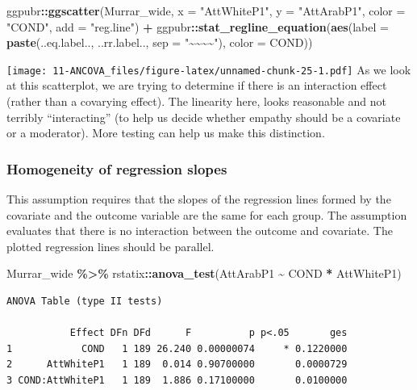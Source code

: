 \documentclass[
  11pt,
]{book}
\newenvironment{Shaded}{\begin{snugshade}}{\end{snugshade}}
\newcommand{\AttributeTok}[1]{\textcolor[rgb]{0.27,0.27,0.27}{#1}}
\newcommand{\FunctionTok}[1]{\textcolor[rgb]{0.27,0.27,0.27}{\textbf{#1}}}
\newcommand{\NormalTok}[1]{#1}
\newcommand{\SpecialCharTok}[1]{\textcolor[rgb]{0.43,0.43,0.43}{\textbf{#1}}}
\newcommand{\StringTok}[1]{\textcolor[rgb]{0.5,0.5,0.5}{#1}}
\begin{document}
\begin{Shaded}
\begin{Highlighting}[]
\NormalTok{ggpubr}\SpecialCharTok{::}\FunctionTok{ggscatter}\NormalTok{(Murrar\_wide, }\AttributeTok{x =} \StringTok{"AttWhiteP1"}\NormalTok{, }\AttributeTok{y =} \StringTok{"AttArabP1"}\NormalTok{, }\AttributeTok{color =} \StringTok{"COND"}\NormalTok{,}
    \AttributeTok{add =} \StringTok{"reg.line"}\NormalTok{) }\SpecialCharTok{+}\NormalTok{ ggpubr}\SpecialCharTok{::}\FunctionTok{stat\_regline\_equation}\NormalTok{(}\FunctionTok{aes}\NormalTok{(}\AttributeTok{label =} \FunctionTok{paste}\NormalTok{(..eq.label..,}
\NormalTok{    ..rr.label.., }\AttributeTok{sep =} \StringTok{"\textasciitilde{}\textasciitilde{}\textasciitilde{}\textasciitilde{}"}\NormalTok{), }\AttributeTok{color =}\NormalTok{ COND))}
\end{Highlighting}
\end{Shaded}

\texttt{[image: 11-ANCOVA\_files/figure-latex/unnamed-chunk-25-1.pdf]} As we look at this scatterplot, we are trying to determine if there is an interaction effect (rather than a covarying effect). The linearity here, looks reasonable and not terribly ``interacting'' (to help us decide whether empathy should be a covariate or a moderator). More testing can help us make this distinction.

\hypertarget{homogeneity-of-regression-slopes-1}{%
\subsubsection{Homogeneity of regression slopes}\label{homogeneity-of-regression-slopes-1}}

This assumption requires that the slopes of the regression lines formed by the covariate and the outcome variable are the same for each group. The assumption evaluates that there is no interaction between the outcome and covariate. The plotted regression lines should be parallel.

\begin{Shaded}
\begin{Highlighting}[]
\NormalTok{Murrar\_wide }\SpecialCharTok{\%\textgreater{}\%}
\NormalTok{    rstatix}\SpecialCharTok{::}\FunctionTok{anova\_test}\NormalTok{(AttArabP1 }\SpecialCharTok{\textasciitilde{}}\NormalTok{ COND }\SpecialCharTok{*}\NormalTok{ AttWhiteP1)}
\end{Highlighting}
\end{Shaded}

\begin{verbatim}
ANOVA Table (type II tests)

           Effect DFn DFd      F          p p<.05       ges
1            COND   1 189 26.240 0.00000074     * 0.1220000
2      AttWhiteP1   1 189  0.014 0.90700000       0.0000729
3 COND:AttWhiteP1   1 189  1.886 0.17100000       0.0100000
\end{verbatim}
\end{document}
